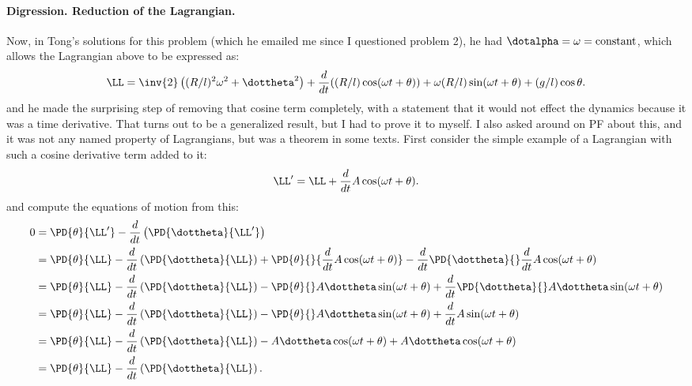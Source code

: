 {\paragraph{Digression.  Reduction of the Lagrangian.}
\label{chap:PJTongMf1:addDerivative}
%
Now, in Tong's solutions for this problem (which he emailed me since I questioned problem 2), he had \(\dotalpha = \omega = \text{constant}\), which allows the
Lagrangian above to be expressed as:
%
\begin{dmath}\label{eqn:tongMf1:1560}
\LL =
\inv{2} \left( (R/l)^2 \omega^2 + \dottheta^2 \right)
+ \frac{d}{dt} ((R/l) \cos( \omega t + \theta )) + \omega (R/l) \sin(\omega t + \theta)
+ (g/l) \cos\theta.
\end{dmath}
%
and he made the surprising step of removing that cosine term completely, with a statement that it would not effect the dynamics because it was a time derivative.
That turns out to be a generalized result, but I had to prove it to myself.  I also asked around on PF about this, and it was not any named property of Lagrangians,
but was a theorem in some texts.
%
First consider the simple example of a Lagrangian with such a cosine derivative term added to it:
%
\begin{equation}\label{eqn:tongMf1:1580}
\LL' = \LL + \frac{d}{dt} A \cos(\omega t + \theta).
\end{equation}
%
and compute the equations of motion from this:
\begin{equation}\label{eqn:tongMf1:520}
\begin{aligned}
0
&= \PD{\theta}{\LL'} - \frac{d}{dt}\left(\PD{\dottheta}{\LL'}\right) \\
&= \PD{\theta}{\LL} - \frac{d}{dt}\left(\PD{\dottheta}{\LL}\right)
+ \PD{\theta}{} {\frac{d}{dt} A \cos(\omega t + \theta)}
- \frac{d}{dt} \PD{\dottheta}{} \frac{d}{dt} A \cos(\omega t + \theta) \\
&= \PD{\theta}{\LL} - \frac{d}{dt}\left(\PD{\dottheta}{\LL}\right)
- \PD{\theta}{} A \dottheta \sin(\omega t + \theta) +
\frac{d}{dt} \PD{\dottheta}{} A \dottheta \sin(\omega t + \theta) \\
&= \PD{\theta}{\LL} - \frac{d}{dt}\left(\PD{\dottheta}{\LL}\right)
- \PD{\theta}{} A \dottheta \sin(\omega t + \theta) + \frac{d}{dt} A \sin(\omega t + \theta) \\
&= \PD{\theta}{\LL} - \frac{d}{dt}\left(\PD{\dottheta}{\LL}\right)
- A \dottheta \cos(\omega t + \theta) + A \dottheta \cos(\omega t + \theta) \\
&= \PD{\theta}{\LL} - \frac{d}{dt}\left(\PD{\dottheta}{\LL}\right)  .

\end{aligned}
\end{equation}}
